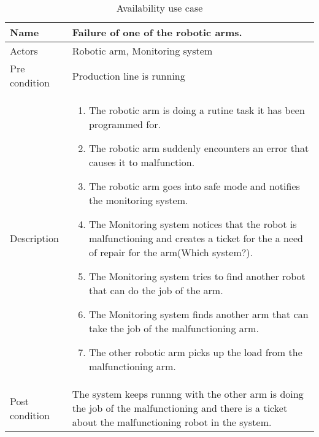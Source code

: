 \begin{table}[h]
\caption{Availability use case}
\centering
\begin{tabular}{|l|p{8cm}|} \hline
Name & Failure of one of the robotic arms. \\ \hline
Actors & Robotic arm, Monitoring system \\ \hline
Pre condition & Production line is running  \\ \hline
Description & \begin{enumerate} 
    \item The robotic arm is doing a rutine task it has been programmed for.
    \item The robotic arm suddenly encounters an error that causes it to malfunction.
    \item The robotic arm goes into safe mode and notifies the monitoring system.
    \item The Monitoring system notices that the robot is malfunctioning and creates a ticket for the a need of repair for the arm(Which system?).
    \item The Monitoring system tries to find another robot that can do the job of the arm.
    \item The Monitoring system finds another arm that can take the job of the malfunctioning arm.
    \item The other robotic arm picks up the load from the malfunctioning arm.
\end{enumerate} \\ \hline
Post condition & The system keeps runnng with the other arm is doing the job of the malfunctioning and there is a ticket about the malfunctioning robot in the system. \\
\hline
\end{tabular}
\end{table}

